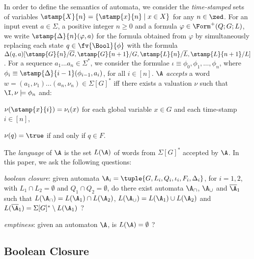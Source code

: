In order to define the semantics of automata, we consider the
\emph{time-stamped} sets of variables $\stamp{X}{n} = \{\stamp{x}{n}
\mid x \in X\}$ for any $n\in\zed$. For an input event $a \in \Sigma$,
a positive integer $n\geq0$ and a formula $\varphi\in\Form^+(Q;G;L)$,
we write $\stamp{\Delta}{n}(\varphi,a)$ for the formula obtained from
$\varphi$ by simultaneously replacing each state $q \in
\fv{\Bool}{\phi}$ with the formula
$\Delta(q,a)[\stamp{G}{n}/\overline{G}, \stamp{G}{n+1}/G,
  \stamp{L}{n}/\overline{L}, \stamp{L}{n+1}/L]$. For a sequence $a_1
\ldots a_n \in \Sigma^*$, we consider the formulae \(\iota \equiv
\phi_0, \phi_1, \ldots, \phi_n \), where $\phi_{i} \equiv
\stamp{\Delta}{i-1}(\phi_{i-1},a_{i})$, for all $i \in [n]$. $\A$
\emph{accepts} a word $w = (a_1,\nu_1) \ldots (a_n,\nu_n) \in
\Sigma[G]^*$ iff there exists a valuation $\nu$ such that
$\I,\nu \models \phi_n$ and: \begin{compactitem}
%
\item $\nu(\stamp{x}{i}) = \nu_i(x)$ for each global variable $x\in G$
  and each time-stamp $i \in [n]$,
%
\item $\nu(q) = \true$ if and only if $q \in F$. 
\end{compactitem}
The \emph{language} of $\A$ is the set $L(\A)$ of words from
$\Sigma[G]^*$ accepted by $\A$. In this paper, we ask the following
questions: \begin{compactenum}
\item \emph{boolean closure}: given automata $\A_i =
  \tuple{G,L_i,Q_i,\iota_i,F_i,\Delta_i}$, for $i=1,2$, with $L_1 \cap
  L_2 = \emptyset$ and $Q_1 \cap Q_2 = \emptyset$, do there exist
  automata $\A_\cap$, $\A_\cup$ and $\overline{\A}_1$ such that
  $L(\A_\cap) = L(\A_1) \cap L(\A_2)$, $L(\A_\cup) = L(\A_1) \cup
  L(\A_2)$ and $L(\overline{\A}_1) = \Sigma[G]^* \setminus L(\A_1)$ ?
%
\item \emph{emptiness}: given an automaton $\A$, is $L(\A) =
  \emptyset$ ?
\end{compactenum}

\subsection{Boolean Closure} 

